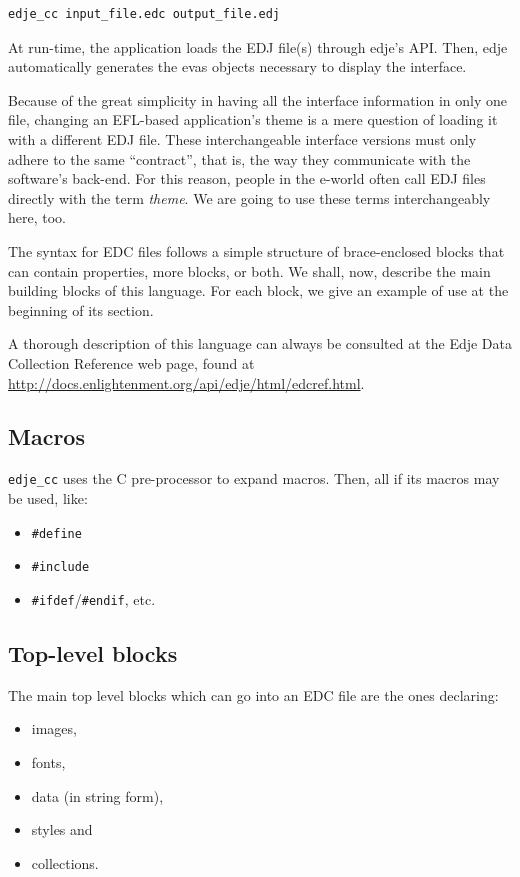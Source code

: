 \documentclass[a4paper]{profusion}
\begin{document}
\begin{verbatim}
edje_cc input_file.edc output_file.edj
\end{verbatim}

At run-time, the application loads the EDJ file(s) through edje's API.
Then, edje automatically generates the evas objects necessary to
display the interface.

Because of the great simplicity in having all the interface
information in only one file, changing an EFL-based application's
theme is a mere question of loading it with a different EDJ
file. These interchangeable interface versions must only adhere to the
same ``contract'', that is, the way they communicate with the
software's back-end. For this reason, people in the e-world often call
EDJ files directly with the term \emph{theme}. We are going to use
these terms interchangeably here, too.

The syntax for EDC files follows a simple structure of brace-enclosed
blocks that can contain properties, more blocks, or both. We shall,
now, describe the main building blocks of this language. For each
block, we give an example of use at the beginning of its section.

A thorough description of this language can always be consulted at the
Edje Data Collection Reference web page, found at \url{
  http://docs.enlightenment.org/api/edje/html/edcref.html}.

\subsection{Macros}

\texttt{edje\_cc} uses the C pre-processor to expand macros. Then, all
if its macros may be used, like:
\begin{itemize}
\item \texttt{\#define}
\item \texttt{\#include}
\item \texttt{\#ifdef}/\texttt{\#endif}, etc.
\end{itemize}

\subsection{Top-level blocks}

The main top level blocks which can go into an EDC file are the ones
declaring:
\begin{itemize}
\item images,
\item fonts,
\item data (in string form),
\item styles and
\item collections.
\end{itemize}
\end{document}
